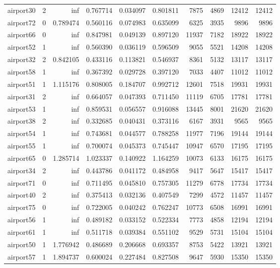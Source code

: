 \begin{longtable}{|l|r|r|r|r|r|r|r|r|r|}
airport30 & 2 & inf & 0.767714 & 0.034097 & 0.801811 & 7875 & 4869 & 12412 & 12412 \\
airport72 & 0 & 0.789474 & 0.560116 & 0.074983 & 0.635099 & 6325 & 3935 & 9896 & 9896 \\
airport66 & 0 & inf & 0.847981 & 0.049139 & 0.897120 & 11937 & 7182 & 18922 & 18922 \\
airport52 & 1 & inf & 0.560390 & 0.036119 & 0.596509 & 9055 & 5521 & 14208 & 14208 \\
airport32 & 2 & 0.842105 & 0.433116 & 0.113821 & 0.546937 & 8361 & 5132 & 13117 & 13117 \\
airport58 & 1 & inf & 0.367392 & 0.029728 & 0.397120 & 7033 & 4407 & 11012 & 11012 \\
airport51 & 1 & 1.115176 & 0.808005 & 0.184707 & 0.992712 & 12601 & 7518 & 19931 & 19931 \\
airport31 & 2 & inf & 0.664057 & 0.047393 & 0.711450 & 11119 & 6705 & 17781 & 17781 \\
airport53 & 1 & inf & 0.859531 & 0.056557 & 0.916088 & 13445 & 8001 & 21620 & 21620 \\
airport38 & 2 & inf & 0.332685 & 0.040431 & 0.373116 & 6167 & 3931 & 9565 & 9565 \\
airport54 & 1 & inf & 0.743681 & 0.044577 & 0.788258 & 11977 & 7196 & 19144 & 19144 \\
airport55 & 1 & inf & 0.700074 & 0.045373 & 0.745447 & 10947 & 6570 & 17195 & 17195 \\
airport65 & 0 & 1.285714 & 1.023337 & 0.140922 & 1.164259 & 10073 & 6133 & 16175 & 16175 \\
airport34 & 2 & inf & 0.443786 & 0.041172 & 0.484958 & 9417 & 5647 & 15417 & 15417 \\
airport71 & 0 & inf & 0.711495 & 0.045810 & 0.757305 & 11279 & 6778 & 17734 & 17734 \\
airport40 & 2 & inf & 0.375413 & 0.032136 & 0.407549 & 7299 & 4572 & 11457 & 11457 \\
airport75 & 0 & inf & 0.722005 & 0.040242 & 0.762247 & 10773 & 6508 & 16991 & 16991 \\
airport56 & 1 & inf & 0.489182 & 0.033152 & 0.522334 & 7773 & 4858 & 12194 & 12194 \\
airport61 & 1 & inf & 0.511718 & 0.039384 & 0.551102 & 9529 & 5731 & 15104 & 15104 \\
airport50 & 1 & 1.776942 & 0.486689 & 0.206668 & 0.693357 & 8753 & 5422 & 13921 & 13921 \\
airport57 & 1 & 1.894737 & 0.600024 & 0.227484 & 0.827508 & 9647 & 5930 & 15350 & 15350 \\

\end{longtable}
